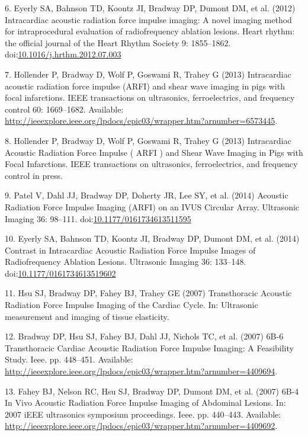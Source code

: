 \documentclass[letterpaper,10pt,english]{sphinxmanual}
\begin{document}
6. Eyerly SA, Bahnson TD, Koontz JI, Bradway DP, Dumont DM, et al.
(2012) Intracardiac acoustic radiation force impulse imaging: A novel
imaging method for intraprocedural evaluation of radiofrequency ablation
lesions. Heart rhythm: the official journal of the Heart Rhythm Society
9: 1855–1862.
doi:\href{http://dx.doi.org/10.1016/j.hrthm.2012.07.003}{10.1016/j.hrthm.2012.07.003}

7. Hollender P, Bradway D, Wolf P, Goswami R, Trahey G (2013)
Intracardiac acoustic radiation force impulse (ARFI) and shear wave
imaging in pigs with focal infarctions. IEEE transactions on
ultrasonics, ferroelectrics, and frequency control 60: 1669–1682.
Available:
\href{http://ieeexplore.ieee.org/lpdocs/epic03/wrapper.htm?arnumber=6573445}{http://ieeexplore.ieee.org/lpdocs/epic03/wrapper.htm?arnumber=6573445}.

8. Hollender P, Bradway D, Wolf P, Goswami R, Trahey G (2013)
Intracardiac Acoustic Radiation Force Impulse ( ARFI ) and Shear Wave
Imaging in Pigs with Focal Infarctions. IEEE transactions on
ultrasonics, ferroelectrics, and frequency control in press.

9. Patel V, Dahl JJ, Bradway DP, Doherty JR, Lee SY, et al. (2014)
Acoustic Radiation Force Impulse Imaging (ARFI) on an IVUS Circular
Array. Ultrasonic Imaging 36: 98–111.
doi:\href{http://dx.doi.org/10.1177/0161734613511595}{10.1177/0161734613511595}

10. Eyerly SA, Bahnson TD, Koontz JI, Bradway DP, Dumont DM, et al.
(2014) Contrast in Intracardiac Acoustic Radiation Force Impulse Images
of Radiofrequency Ablation Lesions. Ultrasonic Imaging 36: 133–148.
doi:\href{http://dx.doi.org/10.1177/0161734613519602}{10.1177/0161734613519602}

11. Hsu SJ, Bradway DP, Fahey BJ, Trahey GE (2007) Transthoracic
Acoustic Radiation Force Impulse Imaging of the Cardiac Cycle. In:
Ultrasonic measurement and imaging of tissue elasticity.

12. Bradway DP, Hsu SJ, Fahey BJ, Dahl JJ, Nichols TC, et al. (2007)
6B-6 Transthoracic Cardiac Acoustic Radiation Force Impulse Imaging: A
Feasibility Study. Ieee. pp. 448–451. Available:
\href{http://ieeexplore.ieee.org/lpdocs/epic03/wrapper.htm?arnumber=4409694}{http://ieeexplore.ieee.org/lpdocs/epic03/wrapper.htm?arnumber=4409694}.

13. Fahey BJ, Nelson RC, Hsu SJ, Bradway DP, Dumont DM, et al. (2007)
6B-4 In Vivo Acoustic Radiation Force Impulse Imaging of Abdominal
Lesions. In: 2007 iEEE ultrasonics symposium proceedings. Ieee. pp.
440–443. Available:
\href{http://ieeexplore.ieee.org/lpdocs/epic03/wrapper.htm?arnumber=4409692}{http://ieeexplore.ieee.org/lpdocs/epic03/wrapper.htm?arnumber=4409692}.
\end{document}
